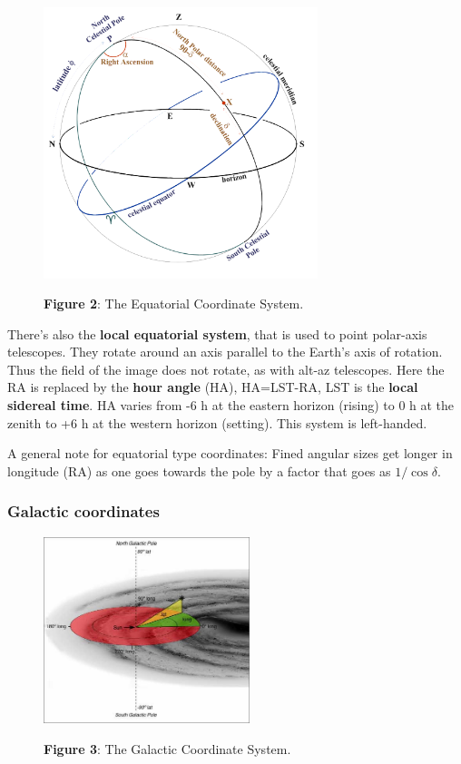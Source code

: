 \documentclass[a4paper]{article}
\begin{document}
\begin{figure}[ht]
\centering
\includegraphics[width=8cm]{img/equatorial.png} \\
\caption*{\textbf{Figure 2}: The Equatorial Coordinate System.}
\end{figure}


There's also the \textbf{local equatorial system}, that is used to point polar-axis telescopes. They rotate around an axis parallel to the Earth's axis of rotation. Thus the field of the image does not rotate, as with alt-az telescopes. Here the RA is replaced by the \textbf{hour angle} (HA), HA=LST-RA, LST is the \textbf{local sidereal time}. HA varies from -6 h at the eastern horizon (rising) to 0 h at the zenith to +6 h at the western horizon (setting). This system is left-handed.

\bigskip

A general note for equatorial type coordinates: Fined angular sizes get longer in longitude (RA) as one goes towards the pole by a factor that goes as $1/\cos\delta$.

\subsubsection*{Galactic coordinates}

\begin{figure}[ht]
\centering
\includegraphics[width=6cm]{img/galactic.jpg} \\
\caption*{\textbf{Figure 3}: The Galactic Coordinate System.}
\end{figure}
\end{document}
